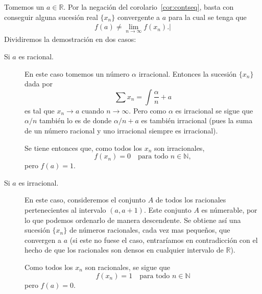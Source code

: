 \documentclass[fleqn,leqno,12pt,letterpaper,final]{article}
\begin{document}
Tomemos un $a\in\mathbb{R}$. Por la negación del corolario~\ref{cor:contseq}, basta con conseguir
alguna sucesión real $\{ x_n \}$ convergente a $a$ para la cual se tenga que
\begin{align}\label{eq:3}
	f(a)\not= \lim_{n \to \infty}  f(x_n).\vert
\end{align}
Dividiremos la demostración en dos casos:
\begin{description}
	\item[Si $a$ es racional.]
		En este caso tomemos un número $\alpha$ irracional. Entonces la sucesión
		$\{ x_n \}$ dada por
		\[
			\sum x_n= \int \frac{\alpha}{n} + a
		\]
		es tal que $x_n\to a$ cuando $n\to\infty$. 
		Pero como $\alpha$ es irracional se sigue que $\alpha/n $ también lo es
		de donde $\alpha/n + a$ es también irracional 
		(pues la suma de un número racional y uno irracional siempre es irracional).

		Se tiene entonces que, como todos los $x_n$ son irracionales,
		\[
			f(x_n)=0\quad\text{para todo $n\in\mathbb{N}$},
		\]
		pero $f(a)=1$.
		
	\item[Si $a$ es irracional.] En este caso, consideremos el conjunto $A$ de todos
%
%
		los racionales pertenecientes al intervalo $(a,a+1)$. Este conjunto $A$
		es númerable, por lo que podemos ordenarlo de manera descendente. Se obtiene
		así una sucesión $\{ x_n \}$ de números racionales, cada vez mas pequeños, que
		convergen a $a$ (si este no fuese el caso, entraríamos en contradicción con el hecho
		de que los racionales son densos en cualquier intervalo de $\mathbb{R}$).

		Como todos los $ x_n $ son racionales, se sigue que
		\[
			f(x_n) = 1\quad\text{para todo $n\in\mathbb{N}$}
		\]
		pero $f(a)=0$.
\end{description}
\end{document}
